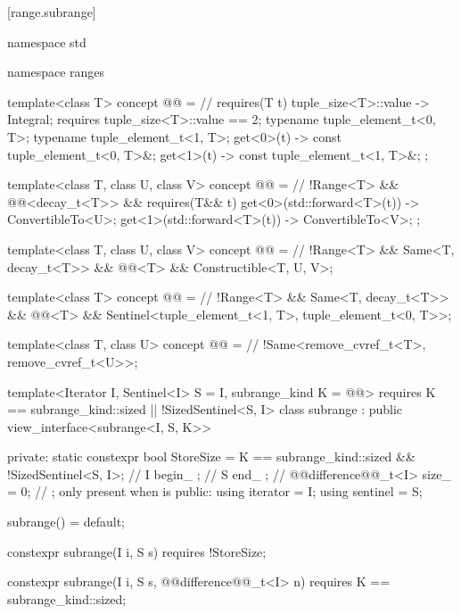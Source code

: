 [range.subrange]{}

%
\begin{codeblock}
namespace std { namespace ranges {
    template<class T>
    concept @@ = // \expos
      requires(T t) {
        { tuple_size<T>::value } -> Integral;
        requires tuple_size<T>::value == 2;
        typename tuple_element_t<0, T>;
        typename tuple_element_t<1, T>;
        { get<0>(t) } -> const tuple_element_t<0, T>&;
        { get<1>(t) } -> const tuple_element_t<1, T>&;
      };

    template<class T, class U, class V>
    concept @@ = // \expos
      !Range<T> && @@<decay_t<T>> &&
      requires(T&& t) {
        { get<0>(std::forward<T>(t)) } -> ConvertibleTo<U>;
        { get<1>(std::forward<T>(t)) } -> ConvertibleTo<V>;
      };

    template<class T, class U, class V>
    concept @@ = // \expos
      !Range<T> && Same<T, decay_t<T>> && @@<T> &&
      Constructible<T, U, V>;

    template<class T>
    concept @@ = // \expos
      !Range<T> && Same<T, decay_t<T>> && @@<T> &&
      Sentinel<tuple_element_t<1, T>, tuple_element_t<0, T>>;

    template<class T, class U>
    concept @@ = // \expos
      !Same<remove_cvref_t<T>, remove_cvref_t<U>>;

    template<Iterator I, Sentinel<I> S = I, subrange_kind K =
        @\oldtxt{\seebelow}@>
      requires K == subrange_kind::sized || !SizedSentinel<S, I>
    class subrange : public view_interface<subrange<I, S, K>> {
    private:
      static constexpr bool StoreSize =
        K == subrange_kind::sized && !SizedSentinel<S, I>; // \expos
      I begin_ {}; // \expos
      S end_ {}; // \expos
      @@difference@@_t<I> size_ = 0; // \expos; only present when  is 
    public:
      using iterator = I;
      using sentinel = S;

      subrange() = default;

      constexpr subrange(I i, S s) requires !StoreSize;

      constexpr subrange(I i, S s, @@difference@@_t<I> n)
        requires K == subrange_kind::sized;

}}}
\end{codeblock}
